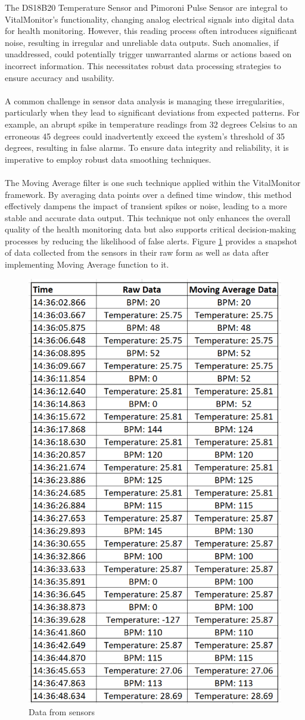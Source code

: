 The DS18B20 Temperature Sensor and Pimoroni Pulse Sensor are integral to VitalMonitor's functionality, changing analog electrical signals into digital data for health monitoring. However, this reading process often introduces significant noise, resulting in irregular and unreliable data outputs.  Such anomalies, if unaddressed, could potentially trigger unwarranted alarms or actions based on incorrect information. This necessitates robust data processing strategies to ensure accuracy and usability. \\ \\
A common challenge in sensor data analysis is managing these irregularities, particularly when they lead to significant deviations from expected patterns. For example, an abrupt spike in temperature readings from 32 degrees Celsius to an erroneous 45 degrees could inadvertently exceed the system’s threshold of 35 degrees, resulting in false alarms. To ensure data integrity and reliability, it is imperative to employ robust data smoothing techniques. \\ \\
The Moving Average filter is one such technique applied within the VitalMonitor framework. By averaging data points over a defined time window, this method effectively dampens the impact of transient spikes or noise, leading to a more stable and accurate data output. This technique not only enhances the overall quality of the health monitoring data but also supports critical decision-making processes by reducing the likelihood of false alerts. Figure \ref{fig:data-sensors} provides a snapshot of data collected from the sensors in their raw form as well as data after implementing Moving Average function to it. \\

\begin{figure}[h!]
    \centering
    \includegraphics[width=0.6\linewidth]{images/data.png}
    \caption{Data from sensors}
    \label{fig:data-sensors}
\end{figure}

